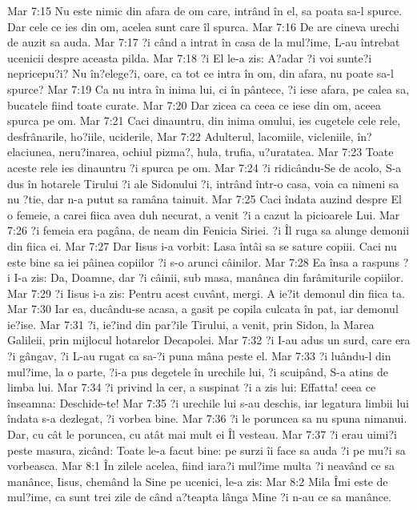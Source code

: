 Mar 7:15  Nu este nimic din afara de om care, intrând în el, sa poata sa-l spurce. Dar cele ce ies din om, acelea sunt care îl spurca.
Mar 7:16  De are cineva urechi de auzit sa auda.
Mar 7:17  ?i când a intrat în casa de la mul?ime, L-au întrebat ucenicii despre aceasta pilda.
Mar 7:18  ?i El le-a zis: A?adar ?i voi sunte?i nepricepu?i? Nu în?elege?i, oare, ca tot ce intra în om, din afara, nu poate sa-l spurce?
Mar 7:19  Ca nu intra în inima lui, ci în pântece, ?i iese afara, pe calea sa, bucatele fiind toate curate.
Mar 7:20  Dar zicea ca ceea ce iese din om, aceea spurca pe om.
Mar 7:21  Caci dinauntru, din inima omului, ies cugetele cele rele, desfrânarile, ho?iile, uciderile,
Mar 7:22  Adulterul, lacomiile, vicleniile, în?elaciunea, neru?inarea, ochiul pizma?, hula, trufia, u?uratatea.
Mar 7:23  Toate aceste rele ies dinauntru ?i spurca pe om.
Mar 7:24  ?i ridicându-Se de acolo, S-a dus în hotarele Tirului ?i ale Sidonului ?i, intrând într-o casa, voia ca nimeni sa nu ?tie, dar n-a putut sa ramâna tainuit.
Mar 7:25  Caci îndata auzind despre El o femeie, a carei fiica avea duh necurat, a venit ?i a cazut la picioarele Lui.
Mar 7:26  ?i femeia era pagâna, de neam din Fenicia Siriei. ?i Îl ruga sa alunge demonii din fiica ei.
Mar 7:27  Dar Iisus i-a vorbit: Lasa întâi sa se sature copiii. Caci nu este bine sa iei pâinea copiilor ?i s-o arunci câinilor.
Mar 7:28  Ea însa a raspuns ?i I-a zis: Da, Doamne, dar ?i câinii, sub masa, manânca din farâmiturile copiilor.
Mar 7:29  ?i Iisus i-a zis: Pentru acest cuvânt, mergi. A ie?it demonul din fiica ta.
Mar 7:30  Iar ea, ducându-se acasa, a gasit pe copila culcata în pat, iar demonul ie?ise.
Mar 7:31  ?i, ie?ind din par?ile Tirului, a venit, prin Sidon, la Marea Galileii, prin mijlocul hotarelor Decapolei.
Mar 7:32  ?i I-au adus un surd, care era ?i gângav, ?i L-au rugat ca sa-?i puna mâna peste el.
Mar 7:33  ?i luându-l din mul?ime, la o parte, ?i-a pus degetele în urechile lui, ?i scuipând, S-a atins de limba lui.
Mar 7:34  ?i privind la cer, a suspinat ?i a zis lui: Effatta! ceea ce înseamna: Deschide-te!
Mar 7:35  ?i urechile lui s-au deschis, iar legatura limbii lui îndata s-a dezlegat, ?i vorbea bine.
Mar 7:36  ?i le poruncea sa nu spuna nimanui. Dar, cu cât le poruncea, cu atât mai mult ei Îl vesteau.
Mar 7:37  ?i erau uimi?i peste masura, zicând: Toate le-a facut bine: pe surzi îi face sa auda ?i pe mu?i sa vorbeasca.
Mar 8:1  În zilele acelea, fiind iara?i mul?ime multa ?i neavând ce sa manânce, Iisus, chemând la Sine pe ucenici, le-a zis:
Mar 8:2  Mila Îmi este de mul?ime, ca sunt trei zile de când a?teapta lânga Mine ?i n-au ce sa manânce.
